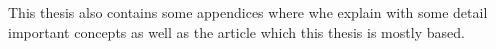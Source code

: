 \documentclass[11pt, twoside]{book}
\begin{document}
  This thesis also contains some appendices where whe explain with some detail important concepts as well as the article which this thesis is mostly based.
  


\end{document}
